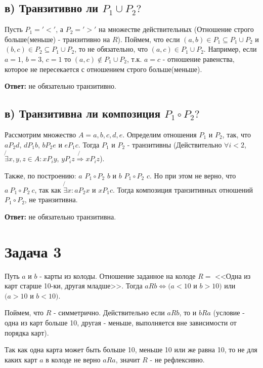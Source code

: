 \documentclass{article}
\begin{document}
	\subsection{в) Транзитивно ли $P_1 \cup P_2?$}
	
	Пусть $P_1 ='<'$, а $P_2 ='>'$ на множестве действительных (Отношение строго больше(меньше) - транзитивно на $R$). Поймем, что если $(a, b) \in P_1 \subseteq P_1 \cup P_2$ и $(b, c) \in P_2 \subseteq P_1 \cup P_2$, то не обязательно, что $(a, c) \in P_1 \cup P_2$. Например, если $a = 1$, $b = 3$, $c = 1$ то $(a, c) \notin P_1 \cup P_2$, т.к. $a = c$ - отношение равенства, которое не пересекается с отношением строго больше(меньше).  
	
	\textbf{Ответ:} не обязательно транзитивно.
	
	\subsection{в) Транзитивна ли композиция $P_1 \circ P_2?$}
	
	Рассмотрим множество $A = {a, b, c, d, e}$. Определим отношения $P_1$ и $P_2$, так, что $a P_2 d$, $d P_1 b$, $b P_2 e$ и $e P_1 c$. Тогда $P_1$ и $P_2$ - транзитивны (Действительно $\forall i < 2$, $\not {\exists} x, y, z \in A: x P_i y$, $y P_i z \not{\Rightarrow} x P_i z$). 
	
	Также, по построению: $a$ $P_1 \circ P_2$ $b$ и $b$ $P_1 \circ P_2$ $c$. Но при этом не верно, что $a \ P_1 \circ P_2 \ c$, так как $\not{\exists} x: a P_2 x$ и $x P_1 c$. Тогда композиция транзитивных отношений $P_1 \circ P_2$, не транзитивна.
	
	\textbf{Ответ:} не обязательно транзитивна.
	
	\section {Задача 3}
	
	Путь $a$ и $b$ - карты из колоды. Отношение заданное на колоде $R = $ <<Одна из карт старше 10-ки, другая младше>>. Тогда $a R b \Leftrightarrow (a < 10$ и $b > 10)$  или $(a > 10$ и $b < 10)$. 
	
	Поймем, что $R$ - симметрично. Действительно если $a R b$, то и $b R a$ (условие - одна из карт больше 10, другая - меньше, выполняется вне зависимости от порядка карт).
	
	Так как одна карта может быть больше 10, меньше 10 или же равна 10, то не для каких карт $a$ в колоде не верно $a R a$, значит $R $ - не рефлексивно.
	
\end{document}
